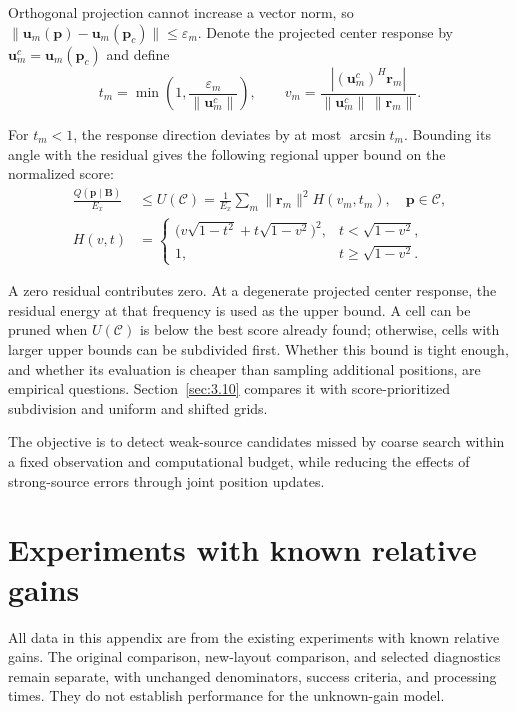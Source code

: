 \documentclass[11pt,a4paper]{article}
\numberwithin{equation}{section}
\numberwithin{figure}{section}
\numberwithin{table}{section}
\begin{document}
Orthogonal projection cannot increase a vector norm, so $\|\mathbf u_m(\mathbf p)-\mathbf u_m(\mathbf p_c)\|\leq\varepsilon_m$. Denote the projected center response by $\mathbf u_m^c=\mathbf u_m(\mathbf p_c)$ and define
\begin{equation}\label{eq:cone-parameters}
t_m=\min\!\left(1,\frac{\varepsilon_m}{\|\mathbf u_m^c\|}\right),\qquad
v_m=\frac{|(\mathbf u_m^c)^H\mathbf r_m|}{\|\mathbf u_m^c\|\,\|\mathbf r_m\|}.
\end{equation}

For $t_m<1$, the response direction deviates by at most $\arcsin t_m$. Bounding its angle with the residual gives the following regional upper bound on the normalized score:
\begin{equation}\label{eq:cell-upper}
\begin{aligned}
\frac{Q(\mathbf p\mid\mathbf B)}{E_x}&\leq U(\mathcal C)
=\frac{1}{E_x}\sum_m\|\mathbf r_m\|^2 H(v_m,t_m),\quad \mathbf p\in\mathcal C,\\
H(v,t)&=\begin{cases}
\bigl(v\sqrt{1-t^2}+t\sqrt{1-v^2}\bigr)^2,&t<\sqrt{1-v^2},\\
1,&t\geq\sqrt{1-v^2}.
\end{cases}
\end{aligned}
\end{equation}

A zero residual contributes zero. At a degenerate projected center response, the residual energy at that frequency is used as the upper bound. A cell can be pruned when $U(\mathcal C)$ is below the best score already found; otherwise, cells with larger upper bounds can be subdivided first. Whether this bound is tight enough, and whether its evaluation is cheaper than sampling additional positions, are empirical questions. Section~\ref{sec:3.10} compares it with score-prioritized subdivision and uniform and shifted grids.

The objective is to detect weak-source candidates missed by coarse search within a fixed observation and computational budget, while reducing the effects of strong-source errors through joint position updates.

\section{Experiments with known relative gains}\label{sec:3}

All data in this appendix are from the existing experiments with known relative gains. The original comparison, new-layout comparison, and selected diagnostics remain separate, with unchanged denominators, success criteria, and processing times. They do not establish performance for the unknown-gain model.
\end{document}
